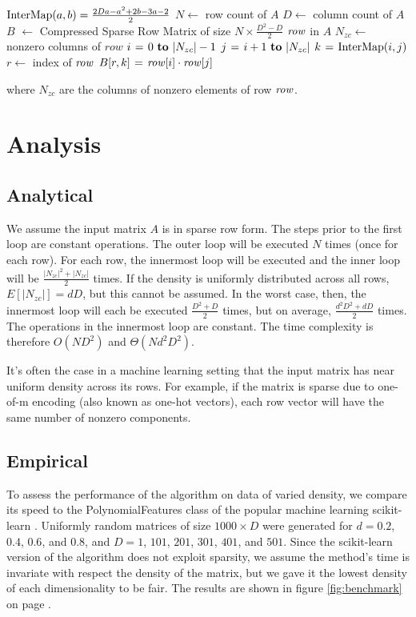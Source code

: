 \documentclass[11pt,onecolumn]{article}
\begin{document}
\begin{codebox}
    \zi $\func{InterMap}(a, b) = \frac{2Da-a^2+2b-3a-2}{2}$
    \zi $N \gets$ row count of $A$
    \zi $D \gets$ column count of $A$
    \zi $B$ $\gets$ Compressed Sparse Row Matrix of size $N \times \frac{D^2-D}{2}$
    \zi \For $\id{row}$ in $A$ \Do
    \zi     $N_{zc} \gets$ nonzero columns of $row$
    \zi     \For $i \gets 0 \To |N_{zc}|-1$ \Do
    \zi         \For $j \gets i+1 \To |N_{zc}|$ \Do
    \zi             $k \gets \func{InterMap}(i, j)$
    \zi             $r \gets$ index of $\id{row}$
    \zi             $B[r, k] \gets \id{row}[i] \cdot \id{row}[j]$
                \End
            \End
       	\End
\end{codebox}

where $N_{zc}$ are the columns of nonzero elements of row $\id{row}$.

\section{Analysis}

\subsection{Analytical}
We assume the input matrix $A$ is in sparse row form. The steps prior to the first loop are
constant operations. The outer loop will be executed $N$ times (once for each row). For each row, 
the innermost loop will be executed and the inner loop will be $\frac{|N_{zc}|^2+|N_{zc}|}{2}$ times.
If the density is uniformly distributed across all rows, $E[|N_{zc}|] = dD$, but this cannot be assumed. In the worst case,
then, the innermost loop will each be executed $\frac{D^2+D}{2}$ times, but on average, $\frac{d^2D^2+dD}{2}$ times.
The operations in the innermost loop are constant. The time complexity is therefore $O(ND^2)$ and $\Theta(Nd^2D^2)$.

It's often the case in a machine learning setting that the input matrix has near uniform density across its rows.
For example, if the matrix is sparse due to one-of-m encoding (also known as one-hot vectors), each row vector will
have the same number of nonzero components.

\subsection{Empirical}
To assess the performance of the algorithm on data of varied density, we compare its speed
to the PolynomialFeatures class of the popular machine learning scikit-learn \cite{scikit-learn}.
Uniformly random matrices of size $1000 \times D$ were generated for $d=0.2$, $0.4$, $0.6$, and $0.8$, and 
$D=1$, $101$, $201$, $301$, $401$, and $501$. Since the scikit-learn version of the algorithm
does not exploit sparsity, we assume the method's time is invariate with respect the density of the matrix, but
we gave it the lowest density of each dimensionality to be fair. The results are shown in figure \eqref{fig:benchmark} on page \pageref{fig:benchmark}.
\end{document}
